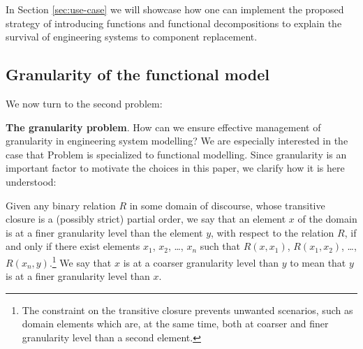 \documentclass[
]{ceurart}
\begin{document}
In Section \ref{sec:use-case} we will showcase how one can implement the proposed strategy of introducing functions and functional decompositions to explain the survival of engineering systems to component replacement.  

\subsection{Granularity of the functional model}
We now turn to the second problem:
\bflist
  \item[\mypb{granularity-problem}] \textbf{The granularity problem}. How can we ensure effective management of granularity in engineering system modelling?
\eflist
We are especially interested in the case that Problem  is specialized to functional modelling.
Since granularity is an important factor to motivate the choices in this paper, we clarify how it is here understood:
\bflist
\item[\mydf{granularity}]
    Given any binary relation $R$ in some domain of discourse, whose transitive closure is a (possibly strict) partial order, we say that an element $x$ of the domain is at a finer granularity level than the element $y$, with respect to the relation $R$, if and only if there exist elements $x_1$, $x_2$, \dots, $x_n$ such that $R(x,x_1)$, $R(x_1,x_2)$, \dots, $R(x_n,y)$.\footnote{The constraint on the transitive closure prevents unwanted scenarios, such as domain elements which are, at the same time, both at coarser and finer granularity level than a second element.} 
    We say that $x$ is at a coarser granularity level than $y$ to mean that $y$ is at a finer granularity level than $x$.
    
\end{document}
